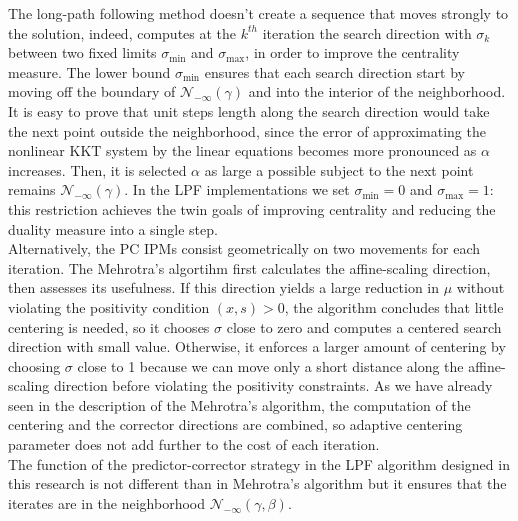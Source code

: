 \documentclass[a4paper,10 pt,titlepage,twoside]{report}
\theoremstyle{plain}
\theoremstyle{definition}
\theoremstyle{remark}
\begin{document}
{{The long-path following method doesn't create a sequence that moves strongly to the solution, indeed, computes at the $k^{th}$ iteration the search direction with $\sigma_{k}$ between two fixed limits $\sigma_{\text{min}}$ and $\sigma_{\text{max}}$, in order to improve the centrality measure. The lower bound $\sigma_{\text{min}}$ ensures that each search direction start by moving off the boundary of $\mathcal{N}_{-\infty}(\gamma)$ and into the interior of the neighborhood. It is easy to prove that unit steps length along the search direction would take the next point outside the neighborhood, since the error of approximating the nonlinear KKT system by the linear equations becomes more pronounced as $\alpha$ increases. Then, it is selected $\alpha$ as large a possible subject to the next point remains $\mathcal{N}_{-\infty}(\gamma)$. In the LPF implementations we set $\sigma_{\text{min}}=0$ and $\sigma_{\text{max}}=1$: this restriction achieves the twin goals of improving centrality and reducing the duality measure into a single step.\\
Alternatively, the PC IPMs consist geometrically on two movements for each iteration. 
The Mehrotra's algortihm first calculates the affine-scaling direction, then assesses its usefulness. If this direction yields a large reduction in $\mu$ without violating the positivity condition $(x, s)> 0$, the algorithm concludes that little centering is needed, so it chooses $\sigma$ close to zero and computes a centered search direction with small value. Otherwise, it enforces a larger amount of centering by choosing $\sigma$ close to 1 because we can move only a short distance along the affine-scaling direction before violating the positivity constraints. As we have already seen in the description of the Mehrotra's algorithm, the computation of the centering and the corrector directions are combined, so adaptive centering parameter does not add further to the cost of each iteration. \\
The function of the predictor-corrector strategy in the LPF algorithm designed in this research is not different than in Mehrotra's algorithm but it ensures that the iterates are in the neighborhood $\mathcal{N}_{-\infty}(\gamma, \beta)$.

}}
\end{document}
